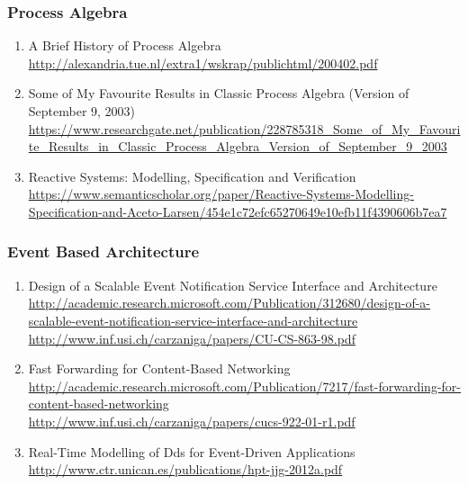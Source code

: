\documentclass{article}
\begin{document}
\subsubsection{Process Algebra}
\begin{enumerate}
	\item {A Brief History of Process Algebra\\
\url{http://alexandria.tue.nl/extra1/wskrap/publichtml/200402.pdf}}
	\item {Some of My Favourite Results in Classic Process Algebra (Version of September 9, 2003)\\
\url{https://www.researchgate.net/publication/228785318_Some_of_My_Favourite_Results_in_Classic_Process_Algebra_Version_of_September_9_2003}}
	\item {Reactive Systems: Modelling, Speciﬁcation and Veriﬁcation\\
\url{https://www.semanticscholar.org/paper/Reactive-Systems-Modelling-Specification-and-Aceto-Larsen/454e1c72efc65270649e10efb11f4390606b7ea7}}
\end{enumerate}


\subsubsection{Event Based Architecture}
\begin{enumerate}
	\item {Design of a Scalable Event Notification Service Interface and Architecture\\
\href{http://academic.research.microsoft.com/Publication/312680/design-of-a-scalable-event-notification-service-interface-and-architecture}{http://academic.research.microsoft.com/Publication/312680/design-of-a-scalable-event-notification-service-interface-and-architecture}\\
\url{http://www.inf.usi.ch/carzaniga/papers/CU-CS-863-98.pdf}}
	\item {Fast Forwarding for Content-Based Networking\\
\href{http://academic.research.microsoft.com/Publication/7217/fast-forwarding-for-content-based-networking}{http://academic.research.microsoft.com/Publication/7217/fast-forwarding-for-content-based-networking}\\
\href{http://www.inf.usi.ch/carzaniga/papers/cucs-922-01-r1.pdf}{http://www.inf.usi.ch/carzaniga/papers/cucs-922-01-r1.pdf}}
	\item {Real-Time Modelling of Dds for Event-Driven Applications\\
\url{http://www.ctr.unican.es/publications/hpt-jjg-2012a.pdf}}
\end{enumerate}
\end{document}
